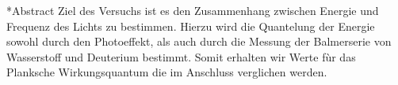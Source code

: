 \documentclass[pdftex, a4paper,11pt, twoside, ngerman]{report}
\begin{document}
  
  
  \begin{chapter}*{Abstract}
    Ziel des Versuchs ist es den Zusammenhang zwischen Energie und Frequenz des Lichts zu bestimmen. Hierzu wird die Quantelung der Energie sowohl durch den Photoeffekt, als auch durch die Messung der Balmerserie von Wasserstoff und Deuterium bestimmt. Somit erhalten wir Werte fùr das Planksche Wirkungsquantum die im Anschluss verglichen werden. 
  \end{chapter}
  
  \tableofcontents
  
  
  
\end{document}
